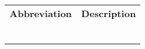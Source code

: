 \begin{table}[h]
    \begin{tabular}{ll}
    \textbf{Abbreviation} & \textbf{Description} \\
                          &             \\
                          &             \\
                          &             \\
                          &             \\
                          &             \\
                          &            
    \end{tabular}
    \end{table}